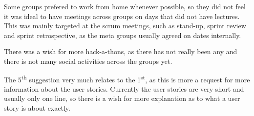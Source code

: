 Some groups prefered to work from home whenever possible, so they did not feel it was ideal to have meetings across groups on days that did not have lectures. This was mainly targeted at the scrum meetings, such as stand-up, sprint review and sprint retrospective, as the meta groups usually agreed on dates internally.

There was a wish for more hack-a-thons, as there has not really been any and there is not many social activities across the groups yet. 

The 5\textsuperscript{th} suggestion very much relates to the 1\textsuperscript{st}, as this is more a request for more information about the user stories. 
Currently the user stories are very short and usually only one line, so there is a wish for more explanation as to what a user story is about exactly.
